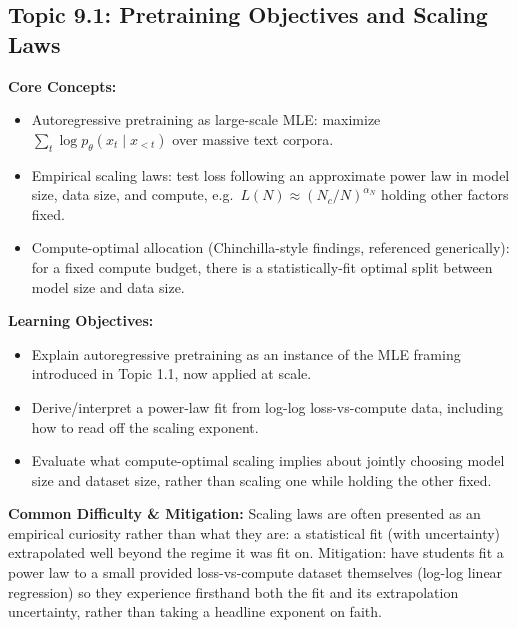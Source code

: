 \documentclass[11pt]{article}
\begin{document}
\subsection{Topic 9.1: Pretraining Objectives and Scaling Laws}

\textbf{Core Concepts:}
\begin{itemize}
  \item Autoregressive pretraining as large-scale MLE: maximize $\sum_t \log p_\theta(x_t \mid x_{<t})$ over massive text corpora.
  \item Empirical scaling laws: test loss following an approximate power law in model size, data size, and compute, e.g.\ $L(N) \approx (N_c/N)^{\alpha_N}$ holding other factors fixed.
  \item Compute-optimal allocation (Chinchilla-style findings, referenced generically): for a fixed compute budget, there is a statistically-fit optimal split between model size and data size.
\end{itemize}

\textbf{Learning Objectives:}
\begin{itemize}
  \item Explain autoregressive pretraining as an instance of the MLE framing introduced in Topic 1.1, now applied at scale.
  \item Derive/interpret a power-law fit from log-log loss-vs-compute data, including how to read off the scaling exponent.
  \item Evaluate what compute-optimal scaling implies about jointly choosing model size and dataset size, rather than scaling one while holding the other fixed.
\end{itemize}

\textbf{Common Difficulty \& Mitigation:} Scaling laws are often presented as an empirical curiosity rather than what they are: a statistical fit (with uncertainty) extrapolated well beyond the regime it was fit on. Mitigation: have students fit a power law to a small provided loss-vs-compute dataset themselves (log-log linear regression) so they experience firsthand both the fit and its extrapolation uncertainty, rather than taking a headline exponent on faith.
\end{document}
